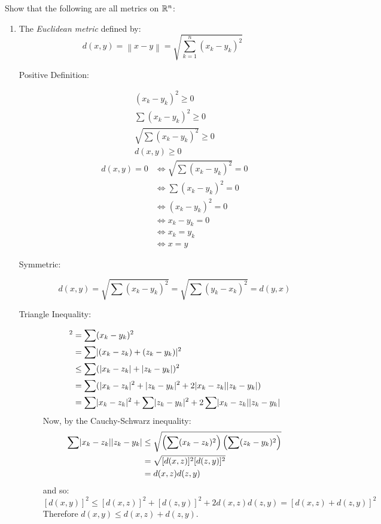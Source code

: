 \documentclass[letterpaper,12pt,fleqn]{article}
\newcommand{\norm}[1]{\left\lVert{#1}\right\rVert}
\begin{document}
\begin{examples}
  Show that the following are all metrics on \(\mathbb{R}^n\):
  \begin{enumerate}
  \item The \emph{Euclidean metric} defined by:
    \[d(x,y)=\norm{x-y}=\sqrt{\sum_{k=1}^n(x_k-y_k)^2}\]

    \begin{description}
    \item[Positive Definition:]
      \begin{gather*}
        (x_k-y_k)^2\ge0 \\
        \sum(x_k-y_k)^2\ge0 \\
        \sqrt{\sum(x_k-y_k)^2}\ge0 \\
        d(x,y)\ge0
      \end{gather*}
      \begin{align*}
        d(x,y)=0 &\iff \sqrt{\sum(x_k-y_k)^2}=0 \\
        &\iff \sum(x_k-y_k)^2=0 \\
        &\iff (x_k-y_k)^2=0 \\
        &\iff x_k-y_k=0 \\
        &\iff x_k=y_k \\
        &\iff x=y
      \end{align*}
    \item[Symmetric:]
      \[d(x,y)=\sqrt{\sum(x_k-y_k)^2}=\sqrt{\sum(y_k-x_k)^2}=d(y,x)\]
    \item[Triangle Inequality:]
      \begin{align*}
        [d(x,y)]^2 &= \sum(x_k-y_k)^2 \\
        &= \sum\abs{(x_k-z_k)+(z_k-y_k)}^2 \\
        &\le \sum(\abs{x_k-z_k}+\abs{z_k-y_k})^2 \\
        &= \sum(\abs{x_k-z_k}^2+\abs{z_k-y_k}^2+2\abs{x_k-z_k}\abs{z_k-y_k}) \\
        &= \sum\abs{x_k-z_k}^2+\sum\abs{z_k-y_k}^2+2\sum\abs{x_k-z_k}\abs{z_k-y_k}
      \end{align*}
      Now, by the Cauchy-Schwarz inequality:
      \begin{align*}
        \sum\lvert x_k-z_k\rvert\lvert z_k-y_k\rvert &\le \sqrt{\left(\sum(x_k-z_k)^2\right)\left(\sum(z_k-y_k)^2\right)} \\
        &= \sqrt{[d(x,z)]^2[d(z,y)]^2} \\
        &= d(x,z)d(z,y)
      \end{align*}
      and so:
      \[[d(x,y)]^2\le[d(x,z)]^2+[d(z,y)]^2+2d(x,z)d(z,y)=[d(x,z)+d(z,y)]^2\]
      Therefore \(d(x,y)\le d(x,z)+d(z,y)\).
    \end{description}


\end{enumerate}
\end{examples}
\end{document}
